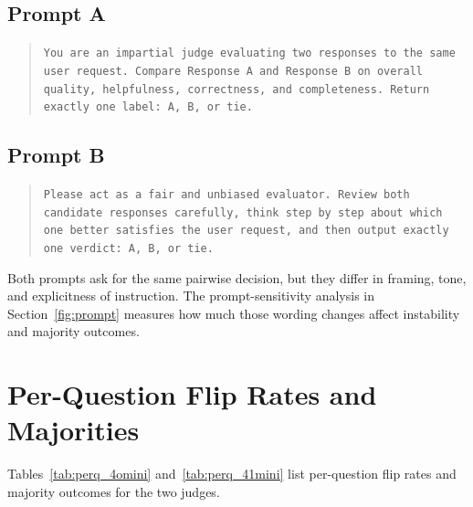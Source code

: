 \documentclass{ijclclp}
\begin{document}
\subsection{Prompt A}
\begin{quote}\small
\texttt{You are an impartial judge evaluating two responses to the same user request. Compare Response A and Response B on overall quality, helpfulness, correctness, and completeness. Return exactly one label: A, B, or tie.}
\end{quote}

\subsection{Prompt B}
\begin{quote}\small
\texttt{Please act as a fair and unbiased evaluator. Review both candidate responses carefully, think step by step about which one better satisfies the user request, and then output exactly one verdict: A, B, or tie.}
\end{quote}

Both prompts ask for the same pairwise decision, but they differ in framing, tone, and explicitness of instruction. The prompt-sensitivity analysis in Section~\ref{fig:prompt} measures how much those wording changes affect instability and majority outcomes.

\section{Per-Question Flip Rates and Majorities}

Tables~\ref{tab:perq_4omini} and~\ref{tab:perq_41mini} list per-question flip rates and majority outcomes for the two judges.
\end{document}
